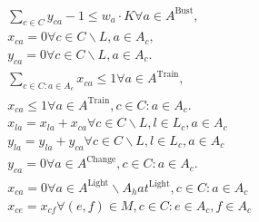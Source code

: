 \begin{align}
  & \sum_{c \in C} y_{c a} - 1 \leq w_{a} \cdot K \forall a \in A^{\text{Bust}} , \tag{eq\_0014} \\
  & x_{c a} = 0 \forall c \in C \backslash L , a \in A_{c} , \tag{eq\_0023} \\
  & y_{c a} = 0 \forall c \in C \backslash L , a \in A_{c} . \tag{eq\_0024} \\
  & \sum_{c \in C : a \in A_{c}} x_{c a} \leq 1 \forall a \in A^{\text{Train}} , \tag{eq\_0025} \\
  & x_{c a} \leq 1 \forall a \in A^{\text{Train}} , c \in C : a \in A_{c} . \tag{eq\_0026} \\
  & x_{l a} = x_{l a} + x_{c a} \forall c \in C \backslash L , l \in L_{c} , a \in A_{c} \tag{eq\_0027} \\
  & y_{l a} = y_{l a} + y_{c a} \forall c \in C \backslash L , l \in L_{c} , a \in A_{c} \tag{eq\_0028} \\
  & y_{c a} = 0 \forall a \in A^{\text{Change}} , c \in C : a \in A_{c} . \tag{eq\_0029} \\
  & x_{c a} = 0 \forall a \in A^{\text{Light}} \backslash A_hat^{\text{Light}} , c \in C : a \in A_{c} \tag{eq\_0030} \\
  & x_{c e} = x_{c f} \forall \left(e , f\right) \in M , c \in C : e \in A_{c} , f \in A_{c} \tag{eq\_0031} \\
\end{align}
